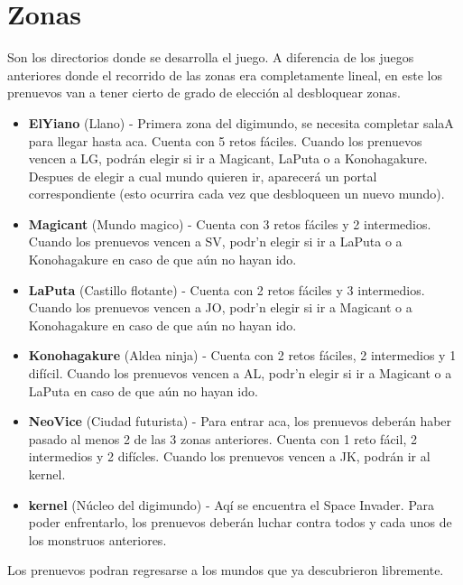 \documentclass[a4paper,10pt]{article}
\begin{document}
\section{Zonas}
	\hspace{1cm} Son los directorios donde se desarrolla el juego. A diferencia de los juegos anteriores donde el recorrido de las zonas era completamente lineal, en este los prenuevos van a tener cierto de grado de elecci\'on al desbloquear zonas.
	\begin{itemize}
		\item \textbf{ElYiano} (Llano) - Primera zona del digimundo, se necesita completar salaA para llegar hasta aca. Cuenta con 5 retos f\'aciles. Cuando los prenuevos vencen a LG, podr\'an elegir si ir a Magicant, LaPuta o a Konohagakure. Despues de elegir a cual mundo quieren ir, aparecer\'a un portal correspondiente (esto ocurrira cada vez que desbloqueen un nuevo mundo).
		
		\item \textbf{Magicant} (Mundo magico) - Cuenta con 3 retos f\'aciles y 2 intermedios. Cuando los prenuevos vencen a SV, podr\a'n elegir si ir a LaPuta o a Konohagakure en caso de que a\'un no hayan ido.
		
		\item \textbf{LaPuta} (Castillo flotante) - Cuenta con 2 retos f\'aciles y 3 intermedios. Cuando los prenuevos vencen a JO, podr\a'n elegir si ir a Magicant o a Konohagakure en caso de que a\'un no hayan ido.
		
		\item \textbf{Konohagakure} (Aldea ninja) - Cuenta con 2 retos f\'aciles, 2 intermedios y 1 dif\'icil. Cuando los prenuevos vencen a AL, podr\a'n elegir si ir a Magicant o a LaPuta en caso de que a\'un no hayan ido.
		
		\item \textbf{NeoVice} (Ciudad futurista) - Para entrar aca, los prenuevos deber\'an haber pasado al menos 2 de las 3 zonas anteriores. Cuenta con 1 reto f\'acil, 2 intermedios y 2 dif\'icles. Cuando los prenuevos vencen a JK, podr\'an ir al kernel.
		
		\item \textbf{kernel} (N\'ucleo del digimundo) - Aq\'i se encuentra el Space Invader. Para poder enfrentarlo, los prenuevos deber\'an luchar contra todos y cada unos de los monstruos anteriores.
	\end{itemize}
	
	\hspace{0.4cm} Los prenuevos podran regresarse a los mundos que ya descubrieron libremente.
	
\end{document}
